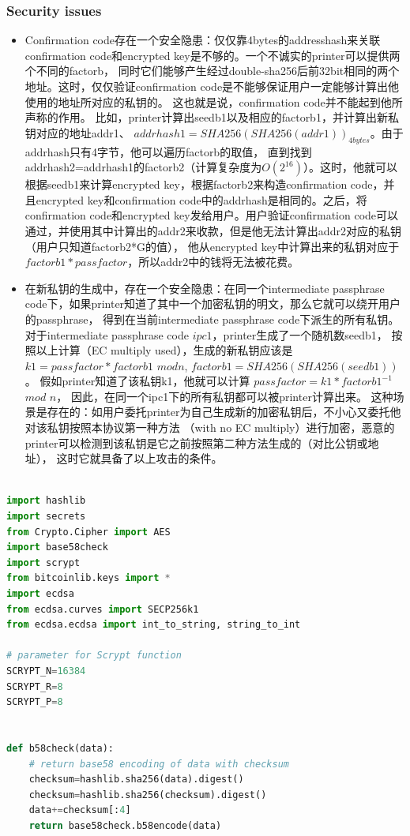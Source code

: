 \subsubsection{ Security issues}
\begin{itemize}

\item Confirmation code存在一个安全隐患：仅仅靠4bytes的addresshash来关联
confirmation code和encrypted key是不够的。一个不诚实的printer可以提供两个不同的factorb，
同时它们能够产生经过double-sha256后前32bit相同的两个地址。这时，仅仅验证confirmation code是不能够保证用户一定能够计算出他使用的地址所对应的私钥的。
这也就是说，confirmation code并不能起到他所声称的作用。
比如，printer计算出seedb1以及相应的factorb1，并计算出新私钥对应的地址addr1、
$addrhash1=SHA256(SHA256(addr1))_{4bytes}$。由于addrhash只有4字节，他可以遍历factorb的取值，
直到找到addrhash2=addrhash1的factorb2（计算复杂度为$O(2^{16})$）。这时，他就可以根据seedb1来计算encrypted key，根据factorb2来构造confirmation code，并且encrypted key和confirmation 
code中的addrhash是相同的。之后，将confirmation code和encrypted key发给用户。用户验证confirmation code可以通过，并使用其中计算出的addr2来收款，但是他无法计算出addr2对应的私钥（用户只知道factorb2*G的值），
他从encrypted key中计算出来的私钥对应于 $factorb1 * passfactor$，所以addr2中的钱将无法被花费。

\item 在新私钥的生成中，存在一个安全隐患：在同一个intermediate passphrase code下，如果printer知道了其中一个加密私钥的明文，那么它就可以绕开用户的passphrase，
得到在当前intermediate passphrase code下派生的所有私钥。
 对于intermediate passphrase code $ipc1$，printer生成了一个随机数seedb1，
 按照以上计算（EC multiply used），生成的新私钥应该是$k1=passfactor * factorb1$ 
 $mod n$, $factorb1=SHA256(SHA256(seedb1))$。 假如printer知道了该私钥k1，他就可以计算 
 $passfactor=k1 * factorb1^{-1}$ $mod$ $n$， 因此，在同一个ipc1下的所有私钥都可以被printer计算出来。  
这种场景是存在的：如用户委托printer为自己生成新的加密私钥后，不小心又委托他对该私钥按照本协议第一种方法
（with no EC multiply）进行加密，恶意的printer可以检测到该私钥是它之前按照第二种方法生成的（对比公钥或地址），
这时它就具备了以上攻击的条件。
\end{itemize}

\begin{lstlisting}[language=python, caption = 测试代码, label=lst-baddersig]

import hashlib 
import secrets
from Crypto.Cipher import AES
import base58check
import scrypt
from bitcoinlib.keys import *
import ecdsa
from ecdsa.curves import SECP256k1
from ecdsa.ecdsa import int_to_string, string_to_int

# parameter for Scrypt function
SCRYPT_N=16384
SCRYPT_R=8
SCRYPT_P=8


def b58check(data):
	# return base58 encoding of data with checksum
	checksum=hashlib.sha256(data).digest()
	checksum=hashlib.sha256(checksum).digest()
	data+=checksum[:4]
	return base58check.b58encode(data)
\end{lstlisting}

